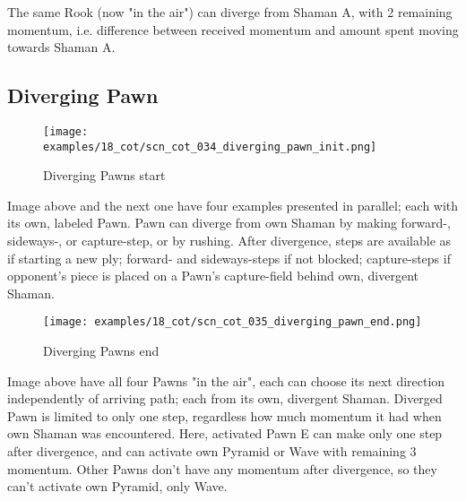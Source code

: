 The same Rook (now "in the air") can diverge from Shaman A, with 2 remaining momentum,
i.e. difference between received momentum and amount spent moving towards Shaman A.

\clearpage %

\subsection*{Diverging Pawn}
\label{sec:Conquest of Tlalocan/Divergence/Diverging Pawn/2} %

\vspace*{-1.4\baselineskip}
\noindent
\begin{figure}[!h]
\texttt{[image: examples/18\_cot/scn\_cot\_034\_diverging\_pawn\_init.png]}
\vspace*{-1.3\baselineskip}
\caption{Diverging Pawns start}
\label{fig:scn_cot_034_diverging_pawn_init}
\end{figure}

\vspace*{-0.5\baselineskip}
Image above and the next one have four examples presented in parallel; each with
its own, labeled Pawn.\newline
\indent
Pawn can diverge from own Shaman by making forward-, sideways-, or capture-step,
or by rushing. After divergence, steps are available as if starting a new ply;
forward- and sideways-steps if not blocked; capture-steps if opponent's piece is
placed on a Pawn's capture-field behind own, divergent Shaman.

\clearpage %

\vspace*{-2.1\baselineskip}
\noindent
\begin{figure}[!h]
\texttt{[image: examples/18\_cot/scn\_cot\_035\_diverging\_pawn\_end.png]}
\vspace*{-1.3\baselineskip}
\caption{Diverging Pawns end}
\label{fig:scn_cot_035_diverging_pawn_end}
\end{figure}

\vspace*{-0.4\baselineskip}
Image above have all four Pawns "in the air", each can choose its next direction
independently of arriving path; each from its own, divergent Shaman.\newline
\indent
Diverged Pawn is limited to only one step, regardless how much momentum it had
when own Shaman was encountered. Here, activated Pawn E can make only one step
after divergence, and can activate own Pyramid or Wave with remaining 3 momentum.
Other Pawns don't have any momentum after divergence, so they can't activate own
Pyramid, only Wave.

